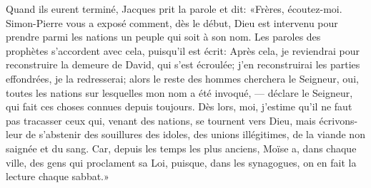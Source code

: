 Quand ils eurent terminé, Jacques prit la parole et dit:
	«Frères, écoutez-moi.
Simon-Pierre vous a exposé comment, dès le début,
	Dieu est intervenu pour prendre parmi les nations
	un peuple qui soit à son nom.
Les paroles des prophètes s’accordent avec cela, puisqu’il est écrit:
	Après cela,
	je reviendrai pour reconstruire la demeure de David, qui s’est écroulée;
	j’en reconstruirai les parties effondrées, je la redresserai;
	alors le reste des hommes cherchera le Seigneur,
	oui, toutes les nations sur lesquelles mon nom a été invoqué,
	--- déclare le Seigneur, qui fait ces choses connues depuis toujours.
Dès lors, moi, j’estime qu’il ne faut pas tracasser
	ceux qui, venant des nations, se tournent vers Dieu,
	mais écrivons-leur de s’abstenir des souillures des idoles,
	des unions illégitimes, de la viande non saignée et du sang.
Car, depuis les temps les plus anciens,
	Moïse a, dans chaque ville, des gens qui proclament sa Loi,
	puisque, dans les synagogues, on en fait la lecture chaque sabbat.»
